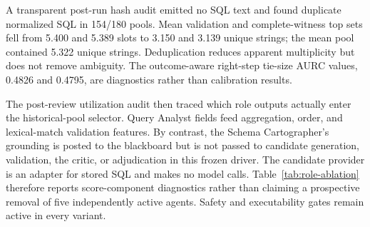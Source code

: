 \documentclass[applsci,article,submit,moreauthors]{Definitions/mdpi}
\begin{document}
A transparent post-run hash audit emitted no SQL text and found duplicate normalized SQL in 154/180 pools. Mean validation and complete-witness top sets fell from 5.400 and 5.389 slots to 3.150 and 3.139 unique strings; the mean pool contained 5.322 unique strings. Deduplication reduces apparent multiplicity but does not remove ambiguity. The outcome-aware right-step tie-size AURC values, 0.4826 and 0.4795, are diagnostics rather than calibration results.

\begin{table}[htbp]
\caption{Exact global candidate-order sensitivity under the unified shape-and-denotation evaluator. All 40,320 orders are outcome-aware diagnostics; original and reverse are two members of that enumeration.}
\label{tab:sensitivity}
\centering
\small
{}
\end{table}

The post-review utilization audit then traced which role outputs actually enter the historical-pool selector. Query Analyst fields feed aggregation, order, and lexical-match validation features. By contrast, the Schema Cartographer's grounding is posted to the blackboard but is not passed to candidate generation, validation, the critic, or adjudication in this frozen driver. The candidate provider is an adapter for stored SQL and makes no model calls. Table~\ref{tab:role-ablation} therefore reports score-component diagnostics rather than claiming a prospective removal of five independently active agents. Safety and executability gates remain active in every variant.
\end{document}
